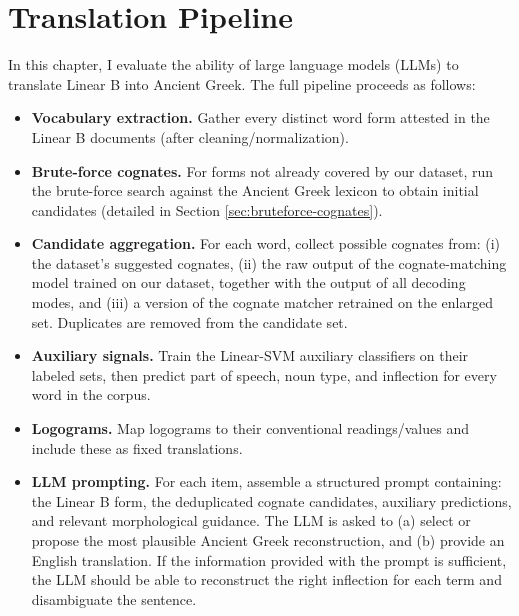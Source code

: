 \chapter{Translation Pipeline} \label{chap:pipeline}
In this chapter, I evaluate the ability of large language models (LLMs) to translate Linear B into Ancient Greek. 
The full pipeline proceeds as follows:

\begin{itemize}[leftmargin=2em]
  \item \textbf{Vocabulary extraction.} Gather every distinct word form attested in the Linear B documents (after cleaning/normalization).
  \item \textbf{Brute-force cognates.} For forms not already covered by our dataset, run the brute-force search against the Ancient Greek lexicon to obtain initial candidates (detailed in Section \ref{sec:bruteforce-cognates}).
  \item \textbf{Candidate aggregation.} For each word, collect possible cognates from: (i) the dataset's suggested cognates, (ii) the raw output of the cognate-matching model trained on our dataset, together with the output of all decoding modes, and (iii) a version of the cognate matcher retrained on the enlarged set. Duplicates are removed from the candidate set.
  \item \textbf{Auxiliary signals.} Train the Linear-SVM auxiliary classifiers on their labeled sets, then predict part of speech, noun type, and inflection for every word in the corpus.
  \item \textbf{Logograms.} Map logograms to their conventional readings/values and include these as fixed translations.
  \item \textbf{LLM prompting.} For each item, assemble a structured prompt containing: the Linear B form, the deduplicated cognate candidates, auxiliary predictions, and relevant morphological guidance. The LLM is asked to (a) select or propose the most plausible Ancient Greek reconstruction, and (b) provide an English translation.
  If the information provided with the prompt is sufficient, the LLM should be able to reconstruct the right inflection for each term and disambiguate the sentence.
\end{itemize}


